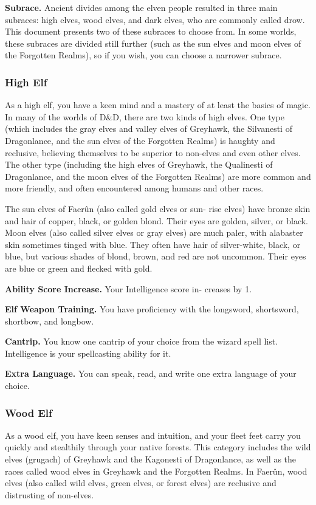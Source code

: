 \textbf{Subrace.} Ancient divides among the elven people resulted in three main subraces: high elves, wood elves, and dark elves, who are commonly called drow. This document presents two of these subraces to choose from. In some worlds, these subraces are divided still further (such as the sun elves and moon elves of the Forgotten Realms), so if you wish, you can choose a narrower subrace.

\subsubsection{High Elf}
As a high elf, you have a keen mind and a mastery of at least the basics of magic. In many of the worlds of D\&D, there are two kinds of high elves. One type (which includes the gray elves and valley elves of Greyhawk, the Silvanesti of Dragonlance, and the sun elves of the Forgotten Realms) is haughty and reclusive, believing themselves to be superior to non-elves and even other elves. The other type (including the high elves of Greyhawk, the Qualinesti of Dragonlance, and the moon elves of the Forgotten Realms) are more common and more friendly, and often encountered among humans and other races.

The sun elves of Faerûn (also called gold elves or sun- rise elves) have bronze skin and hair of copper, black, or golden blond. Their eyes are golden, silver, or black. Moon elves (also called silver elves or gray elves) are much paler, with alabaster skin sometimes tinged with blue. They often have hair of silver-white, black, or blue, but various shades of blond, brown, and red are not uncommon. Their eyes are blue or green and flecked with gold.

\textbf{Ability Score Increase.} Your Intelligence score in- creases by 1.

\textbf{Elf Weapon Training.} You have proficiency with the longsword, shortsword, shortbow, and longbow.

\textbf{Cantrip.} You know one cantrip of your choice from the wizard spell list. Intelligence is your spellcasting ability for it.

\textbf{Extra Language.} You can speak, read, and write one extra language of your choice.

\subsubsection{Wood Elf}
As a wood elf, you have keen senses and intuition, and your fleet feet carry you quickly and stealthily through your native forests. This category includes the wild elves (grugach) of Greyhawk and the Kagonesti of Dragonlance, as well as the races called wood elves in Greyhawk and the Forgotten Realms. In Faerûn, wood elves (also called wild elves, green elves, or forest elves) are reclusive and distrusting of non-elves.

